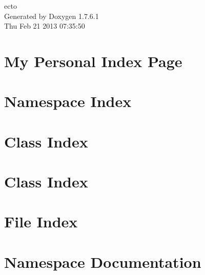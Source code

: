 \documentclass[a4paper]{book}
\begin{document}
\hypersetup{pageanchor=false,citecolor=blue}
\begin{titlepage}
\vspace*{7cm}
\begin{center}
{\Large ecto }\\
\vspace*{1cm}
{\large \-Generated by Doxygen 1.7.6.1}\\
\vspace*{0.5cm}
{\small Thu Feb 21 2013 07:35:50}\\
\end{center}
\end{titlepage}
\clearemptydoublepage
{}
\tableofcontents
\clearemptydoublepage
{}
\hypersetup{pageanchor=true,citecolor=blue}
\chapter{\-My \-Personal \-Index \-Page}
\label{index}\hypertarget{index}{}
\chapter{\-Namespace \-Index}

\chapter{\-Class \-Index}

\chapter{\-Class \-Index}

\chapter{\-File \-Index}

\chapter{\-Namespace \-Documentation}

















\end{document}
